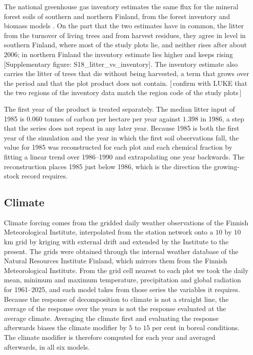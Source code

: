 \documentclass[11pt]{article}
\newcommand{\gap}[1]{\textcolor{red!70!black}{\small[\,#1\,]}}
\newcommand{\suppfig}[1]{\textcolor{blue!55!black}{\small[Supplementary figure: \textsf{#1}]}}
\begin{document}
The national greenhouse gas inventory estimates the same flux for the mineral forest soils of
southern and northern Finland, from the forest inventory and biomass models
\citep{StatFin2025NID}. On the part that the two estimates have in common, the litter from the
turnover of living trees and from harvest residues, they agree in level in southern Finland,
where most of the study plots lie, and neither rises after about 2006; in northern Finland the
inventory estimate lies higher and keeps rising \suppfig{S18\_litter\_vs\_inventory}. The
inventory estimate also carries the litter of trees that die without being harvested, a term
that grows over the period and that the plot product does not contain.
\gap{confirm with LUKE that the two regions of the inventory data match the region code of the
study plots}

The first year of the product is treated separately. The median litter input of 1985
is $0.060$ tonnes of carbon per hectare per year against $1.398$ in 1986, a step that
the series does not repeat in any later year. Because 1985 is both the first year of
the simulation and the year in which the first soil observations fall, the value for
1985 was reconstructed for each plot and each chemical fraction by fitting a linear
trend over 1986--1990 and extrapolating one year backwards. The reconstruction places
1985 just below 1986, which is the direction the growing-stock record requires.



\subsection{Climate}
Climate forcing comes from the gridded daily weather observations of the Finnish
Meteorological Institute, interpolated from the station network onto a $10$ by $10$ km
grid by kriging with external drift \citep{Aalto2016} and extended by the Institute to
the present. The grids were obtained through the internal weather database of the Natural
Resources Institute Finland, which mirrors them from the Finnish Meteorological
Institute. From the grid cell nearest to each plot we took the daily mean, minimum and
maximum temperature, precipitation and global radiation for 1961--2025, and each model
takes from those series the variables it requires. Because the response of
decomposition to climate is not a straight line, the average of the response over the
years is not the response evaluated at the average climate. Averaging the climate first
and evaluating the response afterwards biases the climate modifier by $5$ to $15$ per
cent in boreal conditions. The climate modifier is therefore computed for each year and
averaged afterwards, in all six models.
\end{document}
